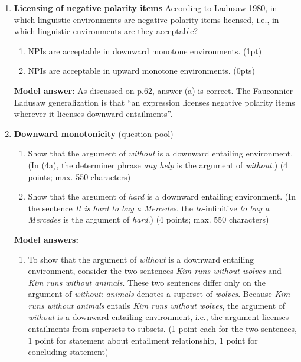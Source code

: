 \documentclass[a4,11pt]{article}
\begin{document}
\begin{enumerate}[leftmargin = 12pt]
\item {\bf Licensing of negative polarity items} According to Ladusaw 1980, in which linguistic environments are negative polarity items licensed, i.e., in which linguistic environments are they acceptable?  

  \begin{enumerate}[noitemsep]
        \item NPIs are acceptable in downward monotone environments. (1pt)
        \item NPIs are acceptable in upward monotone environments. (0pts)
	\end{enumerate}

{\bf Model answer:} As discussed on p.62, answer (a) is correct. The Fauconnier-Ladusaw generalization is that ``an expression licenses negative polarity items wherever it licenses downward entailments''.

\item {\bf Downward monotonicity} (question pool)

\begin{enumerate}[noitemsep]

\item Show that the argument of \textit{without} is a downward entailing environment. (In (4a), the determiner phrase \textit{any help} is the argument of \textit{without}.) (4 points; max. 550 characters)

\item Show that the argument of \textit{hard} is a downward entailing environment. (In the sentence \textit{It is hard to buy a Mercedes}, the \textit{to}-infinitive \textit{to buy a Mercedes} is the argument of \textit{hard}.) (4 points; max. 550 characters)

\end{enumerate}

{\bf Model answers:} 

\begin{enumerate}[noitemsep]

\item To show that the argument of \textit{without} is a downward entailing environment, consider the two sentences \textit{Kim runs without wolves} and \textit{Kim runs without animals}. These two sentences differ only on the argument of {\em without}: {\em animals} denotes a superset of {\em wolves}. Because \textit{Kim runs without animals} entails \textit{Kim runs without wolves}, the argument of \textit{without} is a downward entailing environment, i.e., the argument licenses entailments from supersets to subsets.  (1 point each for the two sentences, 1 point for statement about entailment relationship, 1 point for concluding statement)


\end{enumerate}
\end{enumerate}
\end{document}
